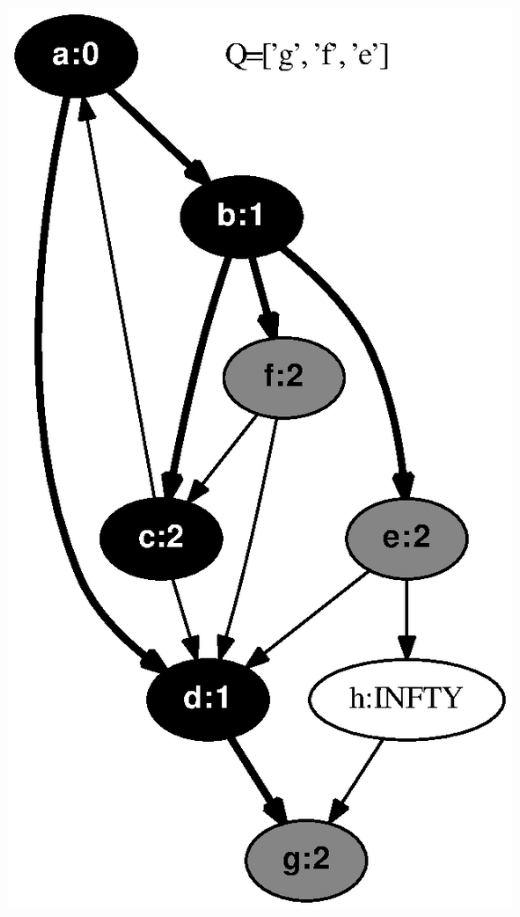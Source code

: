 \documentclass{article}
\begin{document}
\includegraphics[height=.3\textheight]{bfs_directed_classroom_04.eps}
\vspace{1em}
\end{document}
